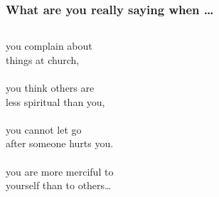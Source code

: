 \begin{frame}

\frametitle{What are you really saying when \dots}
\begin{columns}
\column{4.5cm}
you complain about\\things at church,\\~\\

you think others are\\less spiritual than you,\\~\\

you cannot let go\\after someone hurts you.\\~\\ 

you are more merciful to\\yourself than to others\dots\\~\\~\\
\centering{}
\column{5.5cm}
\end{columns}
~\\
\end{frame}


